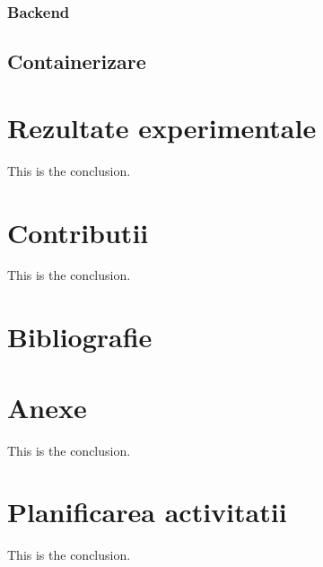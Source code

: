 \documentclass[titlepage,12pt]{article}
\begin{document}
\subsubsection{Backend}
\subsection{Containerizare}

\section{Rezultate experimentale}
This is the conclusion.

\section{Contributii}
This is the conclusion.

\section{Bibliografie}
\printbibliography
\clearpage

\section{Anexe}
This is the conclusion.

\section{Planificarea activitatii}
This is the conclusion.
\end{document}
